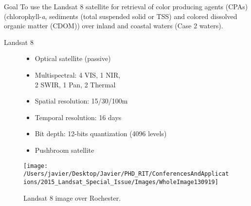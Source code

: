 \documentclass{beamer}
\begin{document}
\begin{frame}{}
\begin{columns}[t]
\begin{column}{.3\linewidth}
\begin{block}{Goal}
\justifying\small 
To use the Landsat 8 satellite for retrieval of color producing agents (CPAs) (chlorophyll-{\it a}, sediments (total suspended solid or TSS) and colored dissolved organic matter (CDOM)) over inland and coastal waters (Case 2 waters). 
\end{block}
\begin{block}{Landsat 8}
\begin{figure}[htb]
\begin{minipage}[c]{0.48\linewidth}
\small
\begin{itemize}
	\item Optical satellite (passive)
	\vspace{.2cm}
	\item Multispectral: 4 VIS, 1 NIR, \\2 SWIR, 1 Pan, 2 Thermal
	\vspace{.2cm}
	\item Spatial resolution: 15/30/100m
	\vspace{.2cm}
	\item Temporal resolution: 16 days
	\vspace{.2cm}
	\item Bit depth: 12-bits quantization (4096 levels)
	\vspace{.2cm}
	\item Pushbroom satellite
\end{itemize}
\end{minipage}
\hfill
\begin{minipage}[c]{0.48\linewidth}
  	\centering
  	\texttt{[image: /Users/javier/Desktop/Javier/PHD\_RIT/ConferencesAndApplications/2015\_Landsat\_Special\_Issue/Images/WholeImage130919]}
  \caption{Landsat 8 image over Rochester. \label{fig:Scene} } 
\end{minipage}
\end{figure}


\end{block}
\end{column}
\end{columns}
\end{frame}
\end{document}

